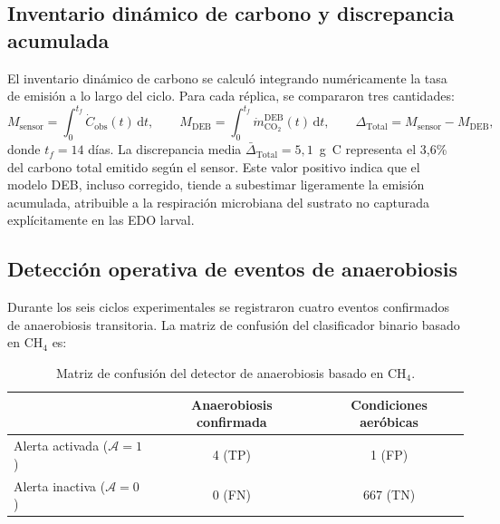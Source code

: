 \subsection{Inventario dinámico de carbono y discrepancia acumulada}
\label{subsec:cap5_inventario_resultados}

El inventario dinámico de carbono se calculó integrando numéricamente la tasa de emisión a lo largo del ciclo. Para cada réplica, se compararon tres cantidades:
\begin{equation}
M_{\mathrm{sensor}} = \int_{0}^{t_f} \dot{C}_{\mathrm{obs}}(t)\,\mathrm{d}t, \qquad
M_{\mathrm{DEB}} = \int_{0}^{t_f} \dot{m}_{\mathrm{CO_2}}^{\mathrm{DEB}}(t)\,\mathrm{d}t, \qquad
\Delta_{\mathrm{Total}} = M_{\mathrm{sensor}} - M_{\mathrm{DEB}},
\end{equation}
donde $t_f = 14$ días. La discrepancia media $\bar{\Delta}_{\mathrm{Total}} = 5{,}1$~g~C representa el 3,6\% del carbono total emitido según el sensor. Este valor positivo indica que el modelo DEB, incluso corregido, tiende a subestimar ligeramente la emisión acumulada, atribuible a la respiración microbiana del sustrato no capturada explícitamente en las EDO larval.

\subsection{Detección operativa de eventos de anaerobiosis}
\label{subsec:cap5_deteccion_anaerobiosis}

Durante los seis ciclos experimentales se registraron cuatro eventos confirmados de anaerobiosis transitoria. La matriz de confusión del clasificador binario basado en CH$_4$ es:

\begin{table}[htbp]
\centering
\caption{Matriz de confusión del detector de anaerobiosis basado en CH$_4$.}
\label{tab:matriz_confusion}
\begin{tabular}{lcc}
\toprule
 & \textbf{Anaerobiosis confirmada} & \textbf{Condiciones aeróbicas} \\
\midrule
Alerta activada ($\mathcal{A}=1$) & 4 (TP) & 1 (FP) \\
Alerta inactiva ($\mathcal{A}=0$) & 0 (FN) & 667 (TN) \\
\bottomrule
\end{tabular}
\end{table}

